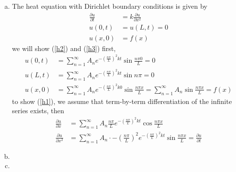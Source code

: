 \documentclass[a4paper,12pt]{article}
\theoremstyle{definition}
\begin{document}
\begin{enumerate}
\begin{enumerate}[(a)]
\item The heat equation with Dirichlet boundary conditions is given by
\begin{align}
\frac{\partial u}{\partial t} &= k \frac{\partial u}{\partial x^2} \label{h1}\\
u(0,t) &= u(L,t)=0 \label{h2}\\
u(x,0) &= f(x) \label{h3}
\end{align}
we will show (\ref{h2}) and (\ref{h3}) first,
\begin{align*}
u(0,t) &= \sum_{n=1}^{\infty}A_ne^{-(\frac{n\pi}{L})^2kt}\sin \frac{n \pi 0}{L}=0\\
u(L,t) &= \sum_{n=1}^{\infty}A_ne^{-(\frac{n\pi}{L})^2kt}\sin n \pi=0\\
u(x,0)&=\sum_{n=1}^{\infty}A_ne^{-(\frac{n\pi}{L})^2k0}\sin \frac{n \pi x}{L}=\sum_{n=1}^{\infty}A_n\sin \frac{n \pi x}{L}=f(x)
\end{align*}
to show (\ref{h1}), we assume that term-by-term differentiation of the infinite series exists, then
\begin{align*}
\frac{\partial u}{\partial x} &= \sum_{n=1}^{\infty}A_n \frac{n\pi}{L}e^{-(\frac{n\pi}{L})^2kt}\cos \frac{n \pi x}{L}\\
\frac{\partial u}{\partial x^2}&= \sum_{n=1}^{\infty}A_n \cdot -\left(\frac{n\pi}{L}\right)^2e^{-(\frac{n\pi}{L})^2kt}\sin \frac{n \pi x}{L}=\frac{\partial u}{\partial t}
\end{align*}

\item


\item
\end{enumerate}



\end{enumerate}
\end{document}
